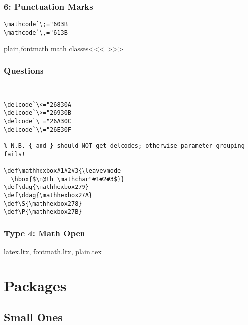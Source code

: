 {{{{{{%
\subsection{6: Punctuation Marks}

\begin{verbatim}
\mathcode`\;="603B
\mathcode`\,="613B
\end{verbatim}

\<plain,fontmath math classes\><<<
>>>

\subsection{Questions}

\begin{verbatim}


\delcode`\<="26830A
\delcode`\>="26930B
\delcode`\|="26A30C
\delcode`\\="26E30F

% N.B. { and } should NOT get delcodes; otherwise parameter grouping fails!

\def\mathhexbox#1#2#3{\leavevmode
  \hbox{$\m@th \mathchar"#1#2#3$}}
\def\dag{\mathhexbox279}
\def\ddag{\mathhexbox27A}
\def\S{\mathhexbox278}
\def\P{\mathhexbox27B}
\end{verbatim}

\subsection{Type 4: Math Open}


latex.ltx, fontmath.ltx, plain.tex



\chapter{Packages}

\section{Small Ones}



}}}}}}
